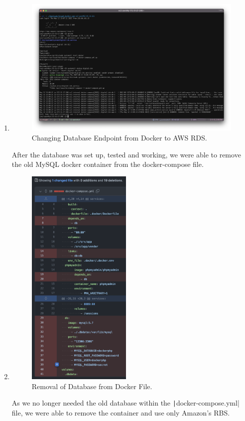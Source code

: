 \begin{enumerate}
    \item
    \begin{figure}[H]
        \centering
        \includegraphics[width=\textwidth]{resources/rds/envupdate}
        \caption{Changing Database Endpoint from Docker to AWS RDS.}
        \label{fig:rds-env-update}
    \end{figure}
    After the database was set up, tested and working, we were able to remove the old MySQL docker container from the
    docker-compose file.

    \item 
    \begin{figure}[H]
        \centering
        \includegraphics[width=50mm]{resources/rds/docker}
        \caption{Removal of Database from Docker File.}
        \label{fig:rds-rm-docker-compose}
    \end{figure}
    As we no longer needed the old database within the \texttt|docker-compose.yml| file, we were able to remove the container and use only Amazon's RBS.
\end{enumerate}